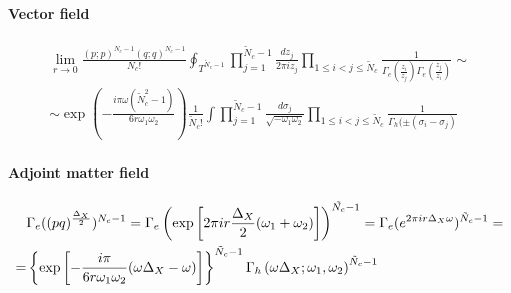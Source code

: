 \begin{appendices}
\begin{comment}
\paragraph{Vector field}
\begin{equation}
\begin{aligned}
 &\prod_{1 \leq i < j \leq N_c } 
  \Gamma_e\left( {z_i \over z_j} \right)
  \Gamma_e\left( {z_j \over z_i} \right) \; = \\
   = &\prod_{1 \leq i < j \leq N_c }  \exp \left[- \frac{i \pi} {6 r \omega_1 \omega_2 }  ( (\sigma_j - \sigma_i) + (\sigma_i- \sigma_j) - 2 \omega) \right] \, \, \Gamma_h (  \sigma_i - \sigma_j) \Gamma_h (  \sigma_j - \sigma_i) =\\
 = & \prod_{1 \leq i < j \leq N_c } \exp \left( {- \frac{i \pi} {6 r \omega_1 \omega_2 }  ( - 2 \omega)}  \right) , \, \Gamma_h (  \sigma_i - \sigma_j) \Gamma_h (  \sigma_j - \sigma_i)
\end{aligned}
\end{equation}
\end{comment}

\paragraph{Vector field}
\begin{multline}
\lim_{r \rightarrow 0} \frac{ (p;p)^{N_c- 1}(q;q)^{N_c- 1} }{ N_c ! }
\oint_{T^{\tilde{N}_c -1}} \prod_{j=1}^{\tilde{N}_c -1 } \frac{ d z_j}{2 \pi i z_j} \prod_{1 \leq i<j \leq \tilde{N}_c } \frac{1}{\Gamma_e( \frac{z_i}{z_j} )\Gamma_e( \frac{z_j}{z_i} )} \sim
\\
\sim 
\exp \left(  
- \frac{ i \pi \omega (\tilde{N}_c^2 -1)}{6 r \omega_1 \omega_2}
\right)
 \frac{1}{\tilde{N}_c !} \int \prod_{j=1}^{\tilde{N}_c -1 } \frac{d \sigma_j}{\sqrt{- \omega_1 \omega_2} } \prod_{1 \leq i<j \leq \tilde{N}_c }\frac{1}{\Gamma_h( \pm (\sigma_i - \sigma_j) }
\end{multline}




\paragraph{Adjoint matter field}

\begin{equation}
\begin{aligned}
& \Gamma_e((pq)^{\frac{\Delta_X}{2}})^{N_c -1} =
\Gamma_e \left( \exp \left[2 \pi i r  {\Delta_X \over 2} (\omega_1 + \omega_2)\right] \right)^{\tilde{N_c}-1} =  \Gamma_e( e^{2 \pi i r  \Delta_X \omega })^{\tilde{N}_c-1} = \\
=  &  \left\{ \exp \left[ - \frac{i \pi} {6 r \omega_1 \omega_2 }  ( \omega \Delta_X - \omega)  \right] \right\} ^{\tilde{N}_c-1} 
\Gamma_h \left( \omega \Delta_X ; \omega_1, \omega_2\right)^{\tilde{N}_c-1}
\end{aligned}
\end{equation}




\end{appendices}
